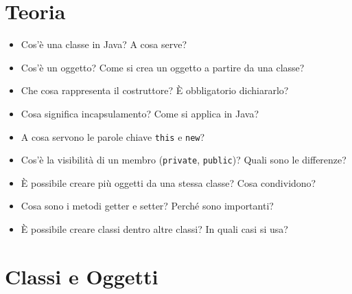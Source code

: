 \documentclass{article}
\begin{document}
\section{Teoria}

\begin{itemize}
    \item Cos'è una classe in Java? A cosa serve?
    \item Cos'è un oggetto? Come si crea un oggetto a partire da una classe?
    \item Che cosa rappresenta il costruttore? È obbligatorio dichiararlo?
    \item Cosa significa incapsulamento? Come si applica in Java?
    \item A cosa servono le parole chiave \texttt{this} e \texttt{new}?
    \item Cos'è la visibilità di un membro (\texttt{private}, \texttt{public})? Quali sono le differenze?
    \item È possibile creare più oggetti da una stessa classe? Cosa condividono?
    \item Cosa sono i metodi getter e setter? Perché sono importanti?
    \item È possibile creare classi dentro altre classi? In quali casi si usa?
\end{itemize}

\section{Classi e Oggetti}
\end{document}

